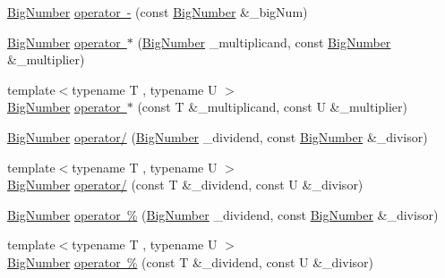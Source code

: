 \textbf{ }\par
\begin{DoxyCompactItemize}
\item 
\mbox{\hyperlink{class_big_nums_1_1_big_number}{Big\+Number}} \mbox{\hyperlink{class_big_nums_1_1_big_number_aa1017a29d47606c15545ea481c1f5dbf}{operator -\/}} (const \mbox{\hyperlink{class_big_nums_1_1_big_number}{Big\+Number}} \&\+\_\+big\+Num)
\end{DoxyCompactItemize}

\textbf{ }\par
\begin{DoxyCompactItemize}
\item 
\mbox{\hyperlink{class_big_nums_1_1_big_number}{Big\+Number}} \mbox{\hyperlink{class_big_nums_1_1_big_number_a390a7b0928f684129947af34272b1def}{operator $\ast$}} (\mbox{\hyperlink{class_big_nums_1_1_big_number}{Big\+Number}} \+\_\+multiplicand, const \mbox{\hyperlink{class_big_nums_1_1_big_number}{Big\+Number}} \&\+\_\+multiplier)
\item 
{\footnotesize template$<$typename T , typename U $>$ }\\\mbox{\hyperlink{class_big_nums_1_1_big_number}{Big\+Number}} \mbox{\hyperlink{class_big_nums_1_1_big_number_ad33abbbc2055753a8b76762a6d5ef947}{operator $\ast$}} (const T \&\+\_\+multiplicand, const U \&\+\_\+multiplier)
\end{DoxyCompactItemize}

\textbf{ }\par
\begin{DoxyCompactItemize}
\item 
\mbox{\hyperlink{class_big_nums_1_1_big_number}{Big\+Number}} \mbox{\hyperlink{class_big_nums_1_1_big_number_a1f3bac79755532f059e42f08126001fe}{operator/}} (\mbox{\hyperlink{class_big_nums_1_1_big_number}{Big\+Number}} \+\_\+dividend, const \mbox{\hyperlink{class_big_nums_1_1_big_number}{Big\+Number}} \&\+\_\+divisor)
\item 
{\footnotesize template$<$typename T , typename U $>$ }\\\mbox{\hyperlink{class_big_nums_1_1_big_number}{Big\+Number}} \mbox{\hyperlink{class_big_nums_1_1_big_number_a90fc1955ccdc202a1d41857dbe8a81a3}{operator/}} (const T \&\+\_\+dividend, const U \&\+\_\+divisor)
\end{DoxyCompactItemize}

\textbf{ }\par
\begin{DoxyCompactItemize}
\item 
\mbox{\hyperlink{class_big_nums_1_1_big_number}{Big\+Number}} \mbox{\hyperlink{class_big_nums_1_1_big_number_a22a2ab555ef01a5b6cdc31751156e4dd}{operator \%}} (\mbox{\hyperlink{class_big_nums_1_1_big_number}{Big\+Number}} \+\_\+dividend, const \mbox{\hyperlink{class_big_nums_1_1_big_number}{Big\+Number}} \&\+\_\+divisor)
\item 
{\footnotesize template$<$typename T , typename U $>$ }\\\mbox{\hyperlink{class_big_nums_1_1_big_number}{Big\+Number}} \mbox{\hyperlink{class_big_nums_1_1_big_number_a17162af4b3ce281f1ac33820450986cd}{operator \%}} (const T \&\+\_\+dividend, const U \&\+\_\+divisor)
\end{DoxyCompactItemize}

